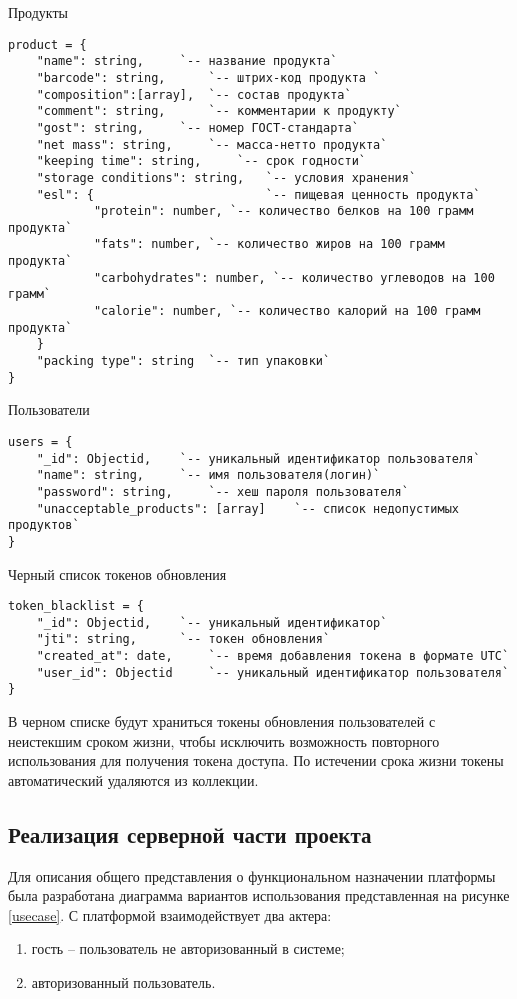 Продукты
\begin{lstlisting}
product = {
	"name": string,		`-- название продукта`
	"barcode": string,		`-- штрих-код продукта `
	"composition":[array],	`-- состав продукта`
	"comment": string,		`-- комментарии к продукту`
	"gost": string,		`-- номер ГОСТ-стандарта`
	"net mass": string,		`-- масса-нетто продукта`
	"keeping time": string,		`-- срок годности`
	"storage conditions": string,	`-- условия хранения`
	"esl": {  						`-- пищевая ценность продукта`
			"protein": number, `-- количество белков на 100 грамм продукта`
			"fats": number,	`-- количество жиров на 100 грамм продукта`
			"carbohydrates": number, `-- количество углеводов на 100 грамм`
			"calorie": number, `-- количество калорий на 100 грамм продукта`
	}
	"packing type": string  `-- тип упаковки`
}
\end{lstlisting}

Пользователи
\begin{lstlisting}
users = {
	"_id": Objectid,	`-- уникальный идентификатор пользователя` 
	"name": string,		`-- имя пользователя(логин)`			
	"password": string,		`-- хеш пароля пользователя`
	"unacceptable_products": [array]	`-- список недопустимых продуктов`
}
\end{lstlisting}

Черный список токенов обновления
\begin{lstlisting}
token_blacklist = {
	"_id": Objectid,	`-- уникальный идентификатор` 
	"jti": string,		`-- токен обновления`			
	"created_at": date,		`-- время добавления токена в формате UTC`
	"user_id": Objectid		`-- уникальный идентификатор пользователя`
}
\end{lstlisting}

В черном списке будут храниться токены обновления пользователей с неистекшим сроком жизни, чтобы исключить возможность повторного использования для получения токена доступа. По истечении срока жизни токены автоматический удаляются из коллекции.

\subsection{Реализация серверной части проекта}

Для описания общего представления о функциональном назначении
платформы была разработана диаграмма вариантов использования представленная на рисунке \ref{usecase}. С платформой взаимодействует два актера:
\begin{enumerate}
	\item гость -- пользователь не авторизованный в системе;
	\item авторизованный пользователь. 
\end{enumerate}

